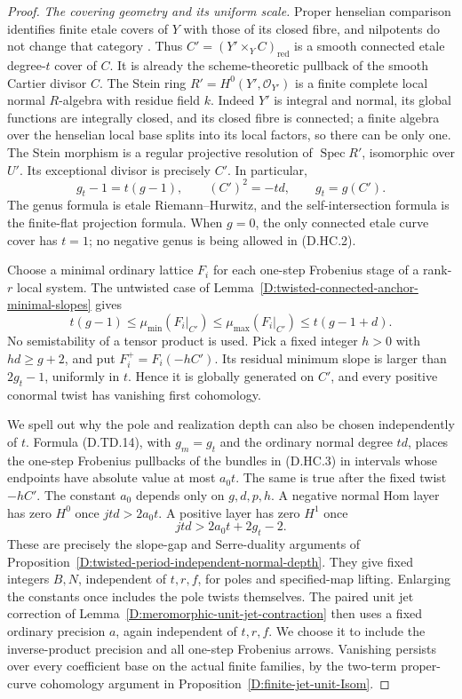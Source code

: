 \begin{proof}
\emph{The covering geometry and its uniform scale.}
Proper henselian comparison identifies finite etale covers of
$Y$ with those of its closed fibre, and nilpotents do not change
that category \citep[Lemma 58.9.1, Tag 0A48, complete proof]
{StacksSingleCurveBrauerD}. Thus
$C'=(Y'\times_Y C)_{\mathrm{red}}$ is a smooth connected
etale degree-$t$ cover of $C$. It is already the scheme-theoretic
pullback of the smooth Cartier divisor $C$. The Stein ring
$R'=H^0(Y',\mathcal O_{Y'})$ is a finite complete local normal
$R$-algebra with residue field $k$. Indeed $Y'$ is integral
and normal, its global functions are integrally closed, and
its closed fibre is connected; a finite algebra over the
henselian local base splits into its local factors, so there
can be only one. The Stein morphism is a regular projective
resolution of $\operatorname{Spec}R'$, isomorphic over $U'$.
Its exceptional divisor is precisely $C'$. In particular,
\[
             g_t-1=t(g-1),\qquad (C')^2=-td,
                         \qquad g_t=g(C').              \tag{D.HC.2}
\]
The genus formula is etale Riemann--Hurwitz, and the
self-intersection formula is the finite-flat projection formula.
When $g=0$, the only connected etale curve cover has $t=1$;
no negative genus is being allowed in (D.HC.2).

Choose a minimal ordinary lattice $F_i$ for each one-step
Frobenius stage of a rank-$r$ local system. The untwisted
case of Lemma~\ref{D:twisted-connected-anchor-minimal-slopes}
gives
\[
 t(g-1)\leq\mu_{\min}(F_i|_{C'})
       \leq\mu_{\max}(F_i|_{C'})
       \leq t(g-1+d).                                  \tag{D.HC.3}
\]
No semistability of a tensor product is used. Pick a fixed
integer $h>0$ with $hd\geq g+2$, and put
$F_i^+=F_i(-hC')$. Its residual minimum slope is larger
than $2g_t-1$, uniformly in $t$. Hence it is globally
generated on $C'$, and every positive conormal twist has
vanishing first cohomology.

We spell out why the pole and realization depth can also be
chosen independently of $t$. Formula (D.TD.14), with
$g_m=g_t$ and the ordinary normal degree $td$, places the
one-step Frobenius pullbacks of the bundles in (D.HC.3)
in intervals whose endpoints have absolute value at most
$a_0t$. The same is true after the fixed twist $-hC'$.
The constant $a_0$ depends only on $g,d,p,h$. A negative
normal Hom layer has zero $H^0$ once
$jtd>2a_0t$. A positive layer has zero $H^1$ once
\[
                jtd>2a_0t+2g_t-2.                      \tag{D.HC.4}
\]
These are precisely the slope-gap and Serre-duality arguments
of Proposition~\ref{D:twisted-period-independent-normal-depth}.
They give fixed integers $B,N$, independent of $t,r,f$, for
poles and specified-map lifting. Enlarging the constants
once includes the pole twists themselves. The paired unit
jet correction of Lemma~\ref{D:meromorphic-unit-jet-contraction}
then uses a fixed ordinary precision $a$, again independent
of $t,r,f$. We choose it to include the inverse-product
precision and all one-step Frobenius arrows. Vanishing
persists over every coefficient base on the actual finite
families, by the two-term proper-curve cohomology argument
in Proposition~\ref{D:finite-jet-unit-Isom}.


\end{proof}
